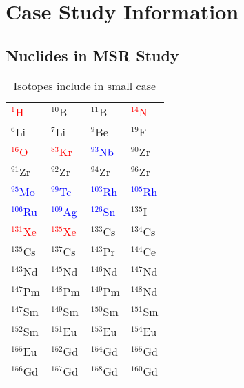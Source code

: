 \section{Case Study Information}
\label{appen:nuclides}

\subsection{Nuclides in MSR Study}

\begin{table}[htbp]
    \caption{\label{tab:small_nuclides} Isotopes include in small case}
    \centering
    \begin{threeparttable}
    \begin{tabular}{C{3cm}C{3cm}C{3cm}C{3cm}}
    \hline
    \textcolor{red}{${}^{1}$H} & ${}^{10}$B & ${}^{11}$B & \textcolor{red}{${}^{14}$N} \\
    ${}^{6}$Li & ${}^{7}$Li & ${}^{9}$Be & ${}^{19}$F \\
    \textcolor{red}{${}^{16}$O} & \textcolor{red}{${}^{83}$Kr} & \textcolor{blue}{${}^{93}$Nb} & ${}^{90}$Zr \\
    ${}^{91}$Zr & ${}^{92}$Zr & ${}^{94}$Zr & ${}^{96}$Zr \\
    \textcolor{blue}{${}^{95}$Mo} & \textcolor{blue}{${}^{99}$Tc} & \textcolor{blue}{${}^{103}$Rh} & \textcolor{blue}{${}^{105}$Rh} \\
    \textcolor{blue}{${}^{106}$Ru} & \textcolor{blue}{${}^{109}$Ag} & \textcolor{blue}{${}^{126}$Sn} & ${}^{135}$I \\
    \textcolor{red}{${}^{131}$Xe} & \textcolor{red}{${}^{135}$Xe} & ${}^{133}$Cs & ${}^{134}$Cs \\
    ${}^{135}$Cs & ${}^{137}$Cs & ${}^{143}$Pr & ${}^{144}$Ce \\
    ${}^{143}$Nd & ${}^{145}$Nd & ${}^{146}$Nd & ${}^{147}$Nd \\
    ${}^{147}$Pm & ${}^{148}$Pm & ${}^{149}$Pm & ${}^{148}$Nd \\
    ${}^{147}$Sm & ${}^{149}$Sm & ${}^{150}$Sm & ${}^{151}$Sm \\
    ${}^{152}$Sm & ${}^{151}$Eu & ${}^{153}$Eu & ${}^{154}$Eu \\
    ${}^{155}$Eu & ${}^{152}$Gd & ${}^{154}$Gd & ${}^{155}$Gd \\
    ${}^{156}$Gd & ${}^{157}$Gd & ${}^{158}$Gd & ${}^{160}$Gd \\

\end{tabular}
\end{threeparttable}
\end{table}
